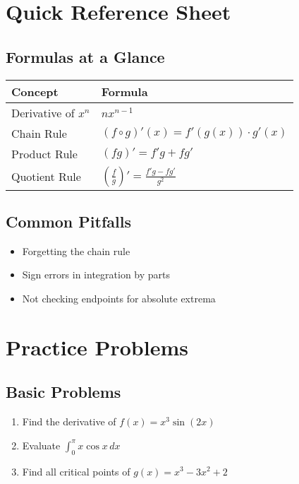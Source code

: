 \documentclass[11pt,a4paper]{article}
\newcommand{\important}[1]{\textbf{\textcolor{red}{#1}}}
\begin{document}
\section{Quick Reference Sheet}

\subsection{Formulas at a Glance}
\begin{center}
\begin{tabular}{|l|l|}
\hline
\textbf{Concept} & \textbf{Formula} \\
\hline
Derivative of $x^n$ & $nx^{n-1}$ \\
\hline
Chain Rule & $(f \circ g)'(x) = f'(g(x)) \cdot g'(x)$ \\
\hline
Product Rule & $(fg)' = f'g + fg'$ \\
\hline
Quotient Rule & $\left(\frac{f}{g}\right)' = \frac{f'g - fg'}{g^2}$ \\
\hline
\end{tabular}
\end{center}

\subsection{Common Pitfalls}
\begin{itemize}
    \item[\important{}] Forgetting the chain rule
    \item[\important{}] Sign errors in integration by parts
    \item[\important{}] Not checking endpoints for absolute extrema
\end{itemize}

\section{Practice Problems}

\subsection{Basic Problems}
\begin{enumerate}
    \item Find the derivative of $f(x) = x^3 \sin(2x)$
    \item Evaluate $\int_0^{\pi} x \cos x\,dx$
    \item Find all critical points of $g(x) = x^3 - 3x^2 + 2$
\end{enumerate}
\end{document}
